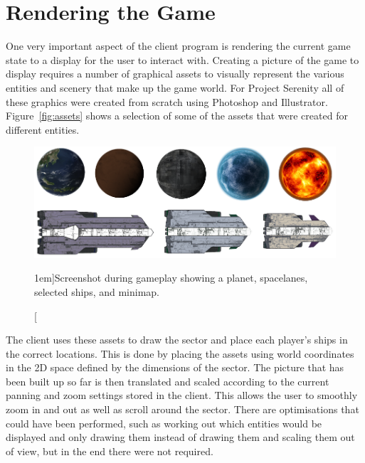 \section{Rendering the Game}



One very important aspect of the client program is rendering the current game state to a display for the user to interact with. Creating a picture of the game to display requires a number of graphical assets to visually represent the various entities and scenery that make up the game world. For Project Serenity all of these graphics were created from scratch using Photoshop and Illustrator. Figure~\ref{fig:assets} shows a selection of some of the assets that were created for different entities.

\begin{figure}[h!]
	\includegraphics{res/serenityscreens/textures.png}
	\caption[][1em]{Screenshot during gameplay showing a planet, spacelanes, selected ships, and minimap.}
	\label{fig:textures}
\end{figure}


%

The client uses these assets to draw the sector and place each player's ships in the correct locations. This is done by placing the assets using world coordinates in the 2D space defined by the dimensions of the sector. The picture that has been built up so far is then translated and scaled according to the current panning and zoom settings stored in the client. This allows the user to smoothly zoom in and out as well as scroll around the sector. There are optimisations that could have been performed, such as working out which entities would be displayed and only drawing them instead of drawing them and scaling them out of view, but in the end there were not required.

